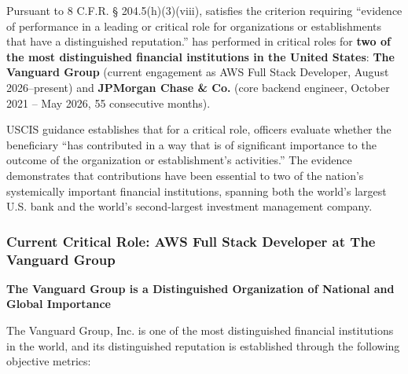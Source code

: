 

Pursuant to 8 C.F.R. § 204.5(h)(3)(viii), \dr satisfies the criterion requiring ``evidence of performance in a leading or critical role for organizations or establishments that have a distinguished reputation.'' \dr has performed in critical roles for \textbf{two of the most distinguished financial institutions in the United States}: \textbf{The Vanguard Group} (current engagement as AWS Full Stack Developer, August 2026--present) and \textbf{JPMorgan Chase \& Co.} (core backend engineer, October 2021 -- May 2026, 55 consecutive months).

USCIS guidance establishes that for a critical role, officers evaluate whether the beneficiary ``has contributed in a way that is of significant importance to the outcome of the organization or establishment's activities.'' The evidence demonstrates that \drs contributions have been essential to two of the nation's systemically important financial institutions, spanning both the world's largest U.S. bank and the world's second-largest investment management company.


\subsubsection{Current Critical Role: AWS Full Stack Developer at The Vanguard Group}
\label{critical:vanguard}

\textbf{The Vanguard Group is a Distinguished Organization of National and Global Importance}

The Vanguard Group, Inc. is one of the most distinguished financial institutions in the world, and its distinguished reputation is established through the following objective metrics:

